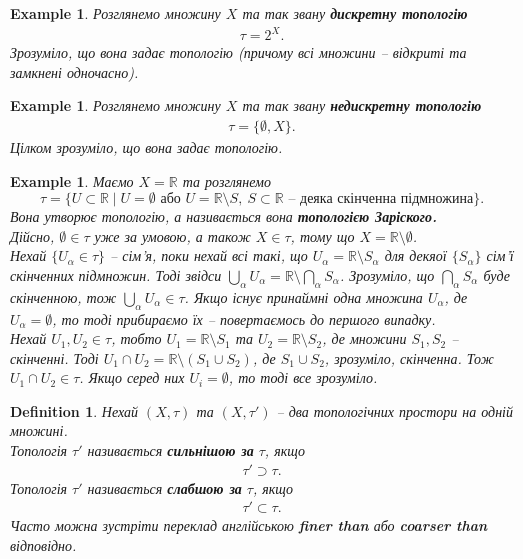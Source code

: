 \documentclass[a4paper, 10pt]{article}
\theoremstyle{theoremdd}
\newtheorem{definition}[theorem]{Definition}
\newtheorem{example}[theorem]{Example}
\begin{document}
\begin{example}
Розглянемо множину $X$ та так звану \textbf{дискретну топологію}
\begin{align*}
\tau = 2^X.
\end{align*}
Зрозуміло, що вона задає топологію (причому всі множини -- відкриті та замкнені одночасно).
\end{example}

\begin{example}
Розглянемо множину $X$ та так звану \textbf{недискретну топологію}
\begin{align*}
\tau = \{\emptyset, X\}.
\end{align*}
Цілком зрозуміло, що вона задає топологію.
\end{example}

\begin{example}
Маємо $X = \mathbb{R}$ та розглянемо 
\[
\tau = \{U \subset \mathbb{R} \mid U = \emptyset \text{ або } U = \mathbb{R} \setminus S,\ S \subset \mathbb{R} \text{ -- деяка скінченна підмножина}\}.
\] 
Вона утворює топологію, а називається вона \textbf{топологією Заріского.}\\
Дійсно, $\emptyset \in \tau$ уже за умовою, а також $X \in \tau$, тому що $X = \mathbb{R} \setminus \emptyset$.\\
Нехай $\{U_\alpha \in \tau\}$ -- сім'я, поки нехай всі такі, що $U_\alpha = \mathbb{R} \setminus S_\alpha$ для декяої $\{S_\alpha\}$ сім'ї скінченних підмножин. Тоді звідси $\displaystyle\bigcup_\alpha U_\alpha = \mathbb{R} \setminus \bigcap_\alpha S_\alpha$. Зрозуміло, що $\displaystyle\bigcap_\alpha S_\alpha$ буде скінченною, тож $\displaystyle\bigcup_\alpha U_\alpha \in \tau$. Якщо існує принаймні одна множина $U_\alpha$, де $U_\alpha = \emptyset$, то тоді прибираємо їх -- повертаємось до першого випадку.\\
Нехай $U_1,U_2 \in \tau$, тобто $U_1 = \mathbb{R} \setminus S_1$ та $U_2 = \mathbb{R} \setminus S_2$, де множини $S_1,S_2$ -- скінченні. Тоді $U_1 \cap U_2 = \mathbb{R} \setminus (S_1 \cup S_2)$, де $S_1 \cup S_2$, зрозуміло, скінченна. Тож $U_1 \cap U_2 \in \tau$. Якщо серед них $U_i = \emptyset$, то тоді все зрозуміло.
\end{example}

\begin{definition}
Нехай $(X,\tau)$ та $(X,\tau')$ -- два топологічних простори на одній множині.\\
Топологія $\tau'$ називається \textbf{сильнішою за} $\tau$, якщо
\begin{align*}
\tau' \supset \tau.
\end{align*}
Топологія $\tau'$ називається \textbf{слабшою за} $\tau$, якщо
\begin{align*}
\tau' \subset \tau.
\end{align*}
Часто можна зустріти переклад англійською \textbf{finer than} або \textbf{coarser than} відповідно.
\end{definition}
\end{document}
